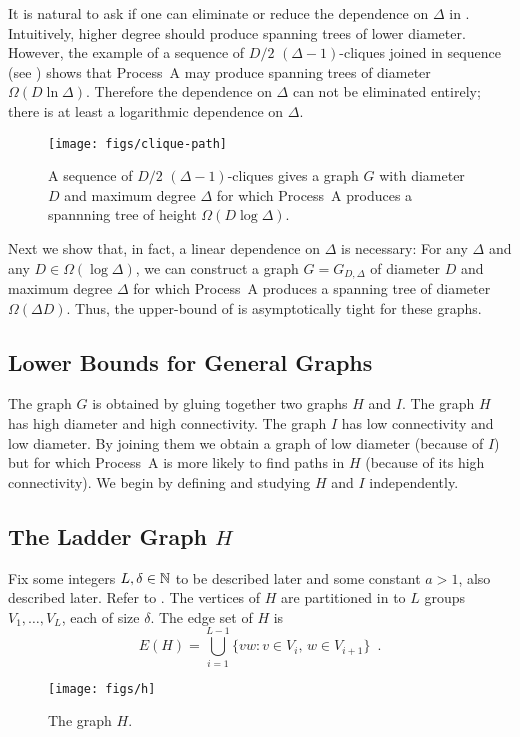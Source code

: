 \documentclass[lotsofwhite]{patmorin}
\begin{document}
It is natural to ask if one can eliminate or reduce the dependence on
$\Delta$ in .  Intuitively, higher degree
should produce spanning trees of lower diameter.  However, the example
of a sequence of $D/2$ $(\Delta-1)$-cliques joined in sequence (see
) shows that Process~A may produce spanning trees
of diameter $\Omega(D\ln\Delta)$.  Therefore the dependence on $\Delta$
can not be eliminated entirely; there is at least a logarithmic dependence
on $\Delta$.

\begin{figure}
  \begin{center}
    \texttt{[image: figs/clique-path]}
  \end{center}
  \caption{A sequence of $D/2$ $(\Delta-1)$-cliques gives a graph $G$
   with diameter $D$ and maximum degree $\Delta$ for which Process~A
   produces a spannning tree of height $\Omega(D\log\Delta)$.}
\end{figure}

Next we show that, in fact, a linear dependence on $\Delta$ is necessary:
For any $\Delta$ and any $D\in\Omega(\log\Delta)$, we can construct a
graph $G=G_{D,\Delta}$ of diameter $D$ and maximum degree $\Delta$ for
which Process~A produces a spanning tree of diameter $\Omega(\Delta D)$.
Thus, the upper-bound of  is asymptotically
tight for these graphs.

\subsection{Lower Bounds for General Graphs}

The graph $G$ is obtained by gluing together two graphs $H$ and $I$.
The graph $H$ has high diameter and high connectivity.  The graph $I$
has low connectivity and low diameter.  By joining them we obtain a graph
of low diameter (because of $I$) but for which Process~A is more likely
to find paths in $H$ (because of its high connectivity).  We begin by
defining and studying $H$ and $I$ independently.


\subsection{The Ladder Graph $H$}

Fix some integers $L,\delta\in\mathbb{N}$ to be described later and some
constant $a>1$, also described later.  Refer to
.  The vertices of $H$ are partitioned in to $L$ groups
$V_1,\ldots,V_L$, each of size $\delta$. The edge set of $H$ is
\[
   E(H) = \bigcup_{i=1}^{L-1} \{vw : v\in V_{i},\, w\in V_{i+1}\} \enspace .
\]
\begin{figure}
  \begin{center}
    \texttt{[image: figs/h]} 
  \end{center}
  \caption{The graph $H$.}
\end{figure}
\end{document}
